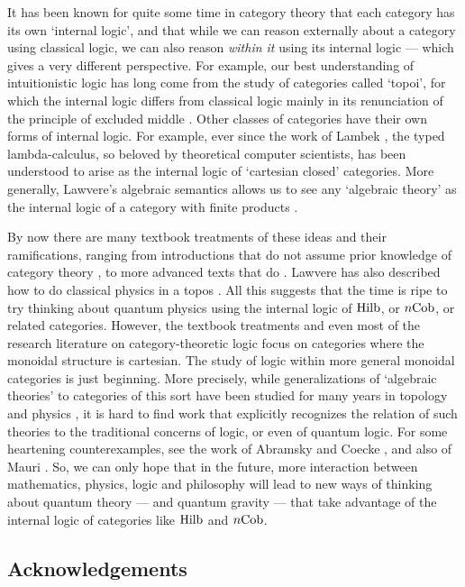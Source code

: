 \documentclass{article}
\newcommand{\Hilb}{{\rm Hilb}}
\newcommand{\Cob}{{\rm Cob}}
\begin{document}
It has been known for quite some time in category theory that
each category has its own `internal logic', and that while we can 
reason externally about a category using classical logic, we can also 
reason {\it within it} using its internal logic --- which gives a very
different perspective.  For example, our best understanding of 
intuitionistic logic has long come from the study of categories called 
`topoi', for which the internal logic differs from classical
logic mainly in its renunciation of the principle 
of excluded middle \cite{BJ,Coste,Mitchell}.  
Other classes of categories have their own forms of internal
logic.  For example, ever since the work of Lambek \cite{Lambek},
the typed lambda-calculus, so beloved by theoretical
computer scientists, has been understood to arise 
as the internal logic of `cartesian closed' categories. 
More generally, Lawvere's algebraic semantics allows
us to see any `algebraic theory' as the internal logic of 
a category with finite products \cite{Lawvere}.  

By now there are many textbook treatments of these ideas and
their ramifications, ranging from introductions that do not assume
prior knowledge of category theory \cite{Crole,McLarty},
to more advanced texts that do \cite{BW,Johnstone,LS,MM}.
Lawvere has also described how to do classical physics in a topos
\cite{Lawvere2,Lawvere3}.
All this suggests that the time is ripe to try thinking about
quantum physics using the internal logic of $\Hilb$, or $n\Cob$, or
related categories.  However, the textbook treatments and even
most of the research literature on category-theoretic logic
focus on categories where the monoidal structure is cartesian.  
The study of logic within more general monoidal categories is 
just beginning.  More precisely, while generalizations of
`algebraic theories' to categories of this sort have been studied 
for many years in topology and physics \cite{LSV,MSS}, it is 
hard to find work that explicitly recognizes the relation of such 
theories to the traditional concerns of logic, or even of quantum logic.
For some heartening counterexamples, see the work of Abramsky
and Coecke \cite{AC}, and also of Mauri \cite{Mauri}.  So, we can 
only hope that in the future, more interaction between mathematics,
physics, logic and philosophy will lead to new ways of thinking about 
quantum theory --- and quantum gravity --- that take advantage of 
the internal logic of categories like $\Hilb$ and $n\Cob$.

\subsection*{Acknowledgements}
\end{document}
